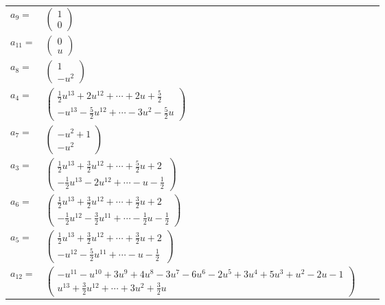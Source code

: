 \documentclass[1p]{elsarticle_modified}
\theoremstyle{definition}
\begin{document}
\begin{tabular}{m{7pt} m{180pt} m{7pt} m{180pt} }
\flushright $a_{9}=$&$\begin{pmatrix}1\\0\end{pmatrix}$ \\
\flushright $a_{11}=$&$\begin{pmatrix}0\\u\end{pmatrix}$ \\
\flushright $a_{8}=$&$\begin{pmatrix}1\\- u^2\end{pmatrix}$ \\
\flushright $a_{4}=$&$\begin{pmatrix}\frac{1}{2} u^{13}+2 u^{12}+\cdots+2 u+\frac{5}{2}\\- u^{13}-\frac{5}{2} u^{12}+\cdots-3 u^2-\frac{5}{2} u\end{pmatrix}$ \\
\flushright $a_{7}=$&$\begin{pmatrix}- u^2+1\\- u^2\end{pmatrix}$ \\
\flushright $a_{3}=$&$\begin{pmatrix}\frac{1}{2} u^{13}+\frac{3}{2} u^{12}+\cdots+\frac{5}{2} u+2\\-\frac{1}{2} u^{13}-2 u^{12}+\cdots- u-\frac{1}{2}\end{pmatrix}$ \\
\flushright $a_{6}=$&$\begin{pmatrix}\frac{1}{2} u^{13}+\frac{3}{2} u^{12}+\cdots+\frac{3}{2} u+2\\-\frac{1}{2} u^{12}-\frac{3}{2} u^{11}+\cdots-\frac{1}{2} u-\frac{1}{2}\end{pmatrix}$ \\
\flushright $a_{5}=$&$\begin{pmatrix}\frac{1}{2} u^{13}+\frac{3}{2} u^{12}+\cdots+\frac{3}{2} u+2\\- u^{12}-\frac{5}{2} u^{11}+\cdots- u-\frac{1}{2}\end{pmatrix}$ \\
\flushright $a_{12}=$&$\begin{pmatrix}- u^{11}- u^{10}+3 u^9+4 u^8-3 u^7-6 u^6-2 u^5+3 u^4+5 u^3+u^2-2 u-1\\u^{13}+\frac{3}{2} u^{12}+\cdots+3 u^2+\frac{3}{2} u\end{pmatrix}$ \\

\end{tabular}
\end{document}
